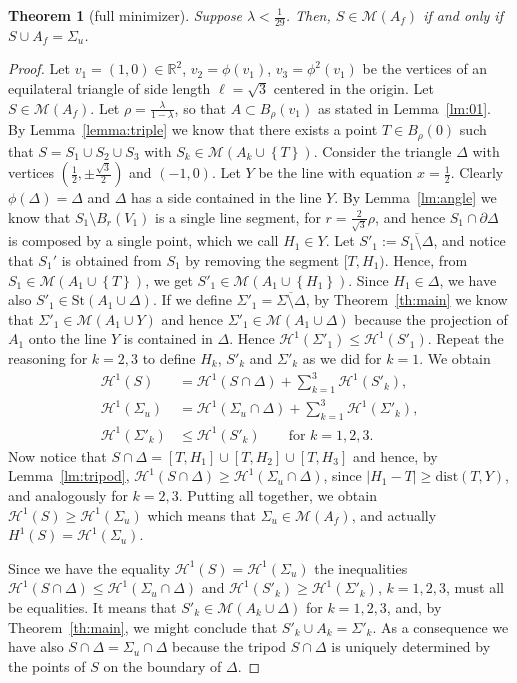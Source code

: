 \documentclass{amsart}
\newcommand{\RR}{\mathbb R}
\renewcommand{\H}{\mathcal H}
\newcommand{\abs}[1]{\left\vert #1 \right\vert}
\newcommand{\enclose}[1]{\left(#1\right)}
\newcommand{\ENCLOSE}[1]{\left\{#1\right\}}
\newcommand{\St}{\mathrm{St}}
\newcommand{\M}{\mathcal{M}}
\renewcommand{\H}{\mathcal{H}}
\newcommand{\dist}{\mathrm{dist}}
\newtheorem{theorem}{Theorem}[section]
\theoremstyle{definition}
\theoremstyle{remark}
\begin{document}
\begin{theorem}[full minimizer]\label{th:full}
  Suppose $\lambda < \frac 1{29}$.
  Then, $S \in \M(A_f)$ if and only if $S\cup A_f = \Sigma_u$.
\end{theorem}
\begin{proof}
  Let $v_1 = (1,0)\in \RR^2$, $v_2=\phi(v_1)$, $v_3=\phi^2(v_1)$ 
  be the vertices of an equilateral 
  triangle of side length $\ell = \sqrt 3$ centered in the origin.
  Let $S\in \M(A_f)$.
  Let $\rho = \frac{\lambda}{1-\lambda}$, so that $A\subset B_\rho(v_1)$ as 
  stated in Lemma~\ref{lm:01}.
  By Lemma~\ref{lemma:triple} we know that there exists a point 
  $T\in B_\rho(0)$ such that $S=S_1\cup S_2\cup S_3$ with $S_k\in \M(A_k\cup \ENCLOSE{T})$.
  Consider the triangle $\Delta$ 
  with vertices $\enclose{\frac 1 2,\pm\frac{\sqrt 3}{2}}$ and $\enclose{-1,0}$.
  Let $Y$ be the line with equation $x=\frac 1 2$.
  Clearly $\phi(\Delta)=\Delta$ and $\Delta$ has a side contained in the line $Y$. 
  By Lemma~\ref{lm:angle} we know that $S_1\setminus B_r(V_1)$ is a single line segment,
  for $r=\frac 2 {\sqrt 3} \rho$,
  and hence $S_1\cap \partial \Delta$ is composed by a single point, 
  which we call $H_1\in Y$. 
  Let $S'_1 := \overline{S_1\setminus \Delta}$, and notice that
  $S_1'$ is obtained from $S_1$ by removing the segment $[T,H_1)$.
  Hence, from $S_1\in \M(A_1\cup \ENCLOSE{T})$, we get $S'_1\in \M(A_1\cup \ENCLOSE{H_1})$. 
  Since $H_1\in \Delta$, we have also $S'_1\in \St(A_1 \cup \Delta)$.
  If we define $\Sigma'_1 = \overline{\Sigma\setminus \Delta}$,
  by Theorem~\ref{th:main} we know that $\Sigma'_1 \in \M(A_1\cup Y)$ 
  and hence $\Sigma'_1 \in \M(A_1\cup \Delta)$ because the projection of $A_1$ onto the line 
  $Y$ is contained in $\Delta$. 
  Hence $\H^1(\Sigma'_1)\le \H^1(S'_1)$.
  Repeat the reasoning for $k=2,3$ to define $H_k$, $S'_k$ and $\Sigma'_k$
  as we did for $k=1$.
  We obtain
  \begin{align*}
    \H^1(S) &= \H^1(S\cap \Delta) + \sum_{k=1}^3 \H^1(S'_k),\\
    \H^1(\Sigma_u) &= \H^1(\Sigma_u\cap \Delta) + \sum_{k=1}^3 \H^1(\Sigma'_k),\\
    \H^1(\Sigma'_k) & \le \H^1(S'_k) \qquad \text{for $k=1,2,3$}.
  \end{align*}
  Now notice that $S\cap \Delta = [T,H_1]\cup [T,H_2]\cup [T,H_3]$
  and hence, by Lemma~\ref{lm:tripod}, $\H^1(S\cap \Delta) \ge \H^1(\Sigma_u\cap \Delta)$,
  since $\abs{H_1 - T}\ge \dist(T,Y)$, and analogously for $k=2,3$.
  Putting all together, we obtain $\H^1(S)\ge \H^1(\Sigma_u)$
  which means that $\Sigma_u\in \M(A_f)$, and actually $H^1(S)=\H^1(\Sigma_u)$.

  Since we have the equality $\H^1(S)=\H^1(\Sigma_u)$ the inequalities 
  $\H^1(S\cap \Delta)\le \H^1(\Sigma_u\cap \Delta)$ and
  $\H^1(S'_k)\ge \H^1(\Sigma'_k)$, $k=1,2,3$, must all be equalities.
  It means that $S'_k\in \M(A_k\cup \Delta)$ for $k=1,2,3$, and,
  by Theorem~\ref{th:main}, we might conclude that $S'_k\cup A_k = \Sigma'_k$.
  As a consequence we have also $S\cap \Delta = \Sigma_u\cap \Delta$ because 
  the tripod $S\cap \Delta$ is uniquely determined by the points of $S$ on 
  the boundary of $\Delta$.
\end{proof}
\end{document}
